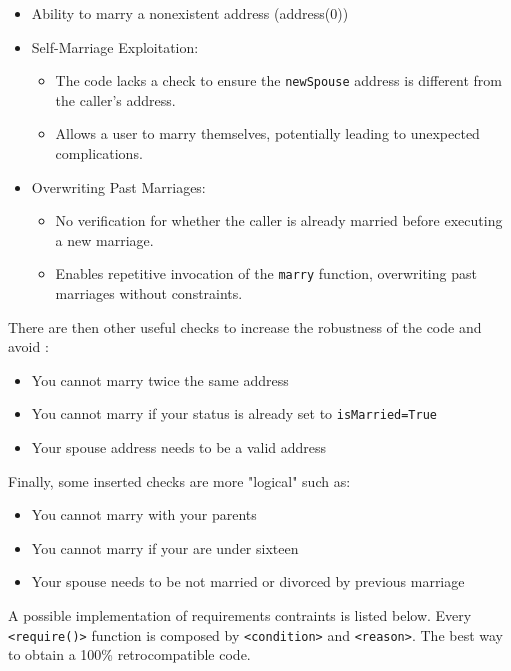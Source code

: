 \documentclass{article}
\begin{document}
 \begin{itemize}
        \small
    \item Ability to marry a nonexistent address (address(0))
    \item Self-Marriage Exploitation:
    \begin{itemize}
            \small
        \item The code lacks a check to ensure the \texttt{newSpouse} address is different from the caller's address.
        \item Allows a user to marry themselves, potentially leading to unexpected complications.
    \end{itemize}

    \item Overwriting Past Marriages:
    \begin{itemize}
            \small
        \item No verification for whether the caller is already married before executing a new marriage.
        \item Enables repetitive invocation of the \texttt{marry} function, overwriting past marriages without constraints.
    \end{itemize}
\end{itemize}
There are then other useful checks to increase the robustness of the code and avoid :
\begin{itemize}
    \small
\item You cannot marry twice the same address
\item You cannot marry if your status is already set to \texttt{isMarried=True}
\item Your spouse address needs to be a valid address
\end{itemize}
Finally, some inserted checks are more "logical" such as:
\begin{itemize}
    \small
    \item You cannot marry with your parents
    \item You cannot marry if your are under sixteen
    \item Your spouse needs to be not married or divorced by previous marriage
\end{itemize}
A possible implementation of requirements contraints is listed below. Every \texttt{<require()>} function is composed by \texttt{<condition>} and \texttt{<reason>}. The best way to obtain a 100\% retrocompatible code.
\end{document}
